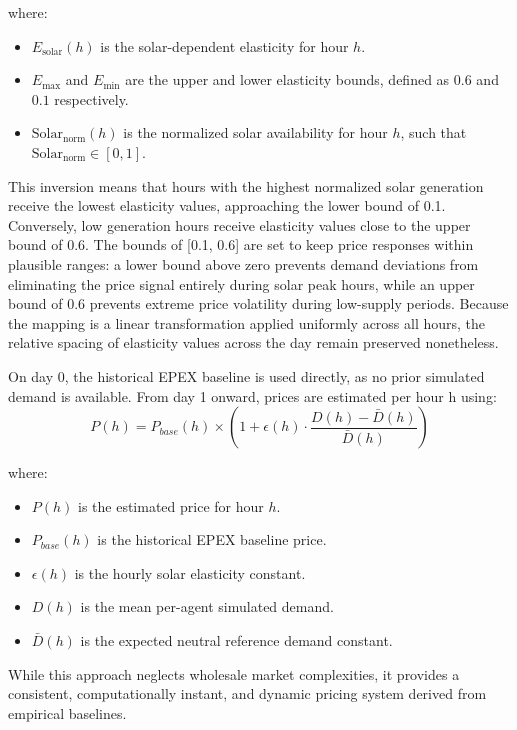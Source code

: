 \documentclass[11pt, a4paper]{article}
\begin{document}
\noindent where:
\begin{itemize}
    \item $E_{\text{solar}}(h)$ is the solar-dependent elasticity for hour $h$.
    \item $E_{\text{max}}$ and $E_{\text{min}}$ are the upper and lower elasticity bounds, defined as $0.6$ and $0.1$ respectively.
    \item $\text{Solar}_{\text{norm}}(h)$ is the normalized solar availability for hour $h$, such that $\text{Solar}_{\text{norm}} \in [0, 1]$.
\end{itemize}
This inversion means that hours with the highest normalized solar generation receive the lowest elasticity values, approaching the lower bound of 0.1. Conversely, low generation hours receive elasticity values close to the upper bound of 0.6. The bounds of [0.1, 0.6] are set to keep price responses within plausible ranges: a lower bound above zero prevents demand deviations from eliminating the price signal entirely during solar peak hours, while an upper bound of 0.6 prevents extreme price volatility during low-supply periods. Because the mapping is a linear transformation applied uniformly across all hours, the relative spacing of elasticity values across the day remain preserved nonetheless. 

On day 0, the historical EPEX baseline is used directly, as no prior simulated demand is available. From day 1 onward, prices are estimated per hour h using:
\begin{equation}
    P(h) = P_{base}(h) \times \left( 1 + \epsilon(h) \cdot \frac{D(h) - \bar{D}(h)}{\bar{D}(h)} \right)
\end{equation}

\noindent where:
\begin{itemize}
    \item $P(h)$ is the estimated price for hour $h$.
    \item $P_{base}(h)$ is the historical EPEX baseline price.
    \item $\epsilon(h)$ is the hourly solar elasticity constant.
    \item $D(h)$ is the mean per-agent simulated demand.
    \item $\bar{D}(h)$ is the expected neutral reference demand constant.
\end{itemize}

While this approach neglects wholesale market complexities, it provides a consistent, computationally instant, and dynamic pricing system derived from empirical baselines. 
\end{document}
